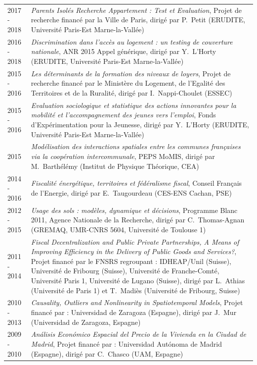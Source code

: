 \documentclass[a4paper,12pt]{article}
\begin{document}
\begin{longtable}{@{}p{\annee}p{\texte}@{}}
2017 - 2018 & \og{}\textit{Parents Isolés Recherche Appartement : Test et Evaluation}\fg{}, Projet de recherche financé par la Ville de Paris, dirigé par P.~Petit (ERUDITE, Université Paris-Est Marne-la-Vallée) \\
2016 - 2018 & \og{}\textit{Discrimination dans l'accès au logement : un testing de couverture nationale}\fg{}, ANR 2015 Appel générique, dirigé par Y.~L'Horty (ERUDITE, Université Paris-Est Marne-la-Vallée) \\
2015 - 2016 & \og{}\textit{Les déterminants de la formation des niveaux de loyers}\fg{}, Projet de recherche financé par le Ministère du Logement, de l'Egalité des Territoires et de la Ruralité, dirigé par I.~Nappi-Choulet (ESSEC) \\
2015 - 2016 & \og{}\textit{Evaluation sociologique et statistique des actions innovantes pour la mobilité et l'accompagnement des jeunes vers l'emploi}\fg{}, Fonds d'Expérimentation pour la Jeunesse, dirigé par Y.~L'Horty (ERUDITE, Université Paris-Est Marne-la-Vallée) \\
2015 		& \og{}\textit{Modélisation des interactions spatiales entre les communes françaises via la coopération intercommunale}\fg{}, PEPS MoMIS, dirigé par M.~Barthélémy (Institut de Physique Théorique, CEA) \\
2014 - 2016 & \og{}\textit{Fiscalité énergétique, territoires et fédéralisme fiscal}\fg{}, Conseil Français de l'Energie, dirigé par E.~Taugourdeau (CES-ENS Cachan, PSE) \\
2012 - 2015 & \og{}\textit{Usage des sols : modèles, dynamique et décisions}\fg{}, Programme Blanc 2011, Agence Nationale de la Recherche, dirigé par C.~Thomas-Agnan (GREMAQ, UMR-CNRS 5604, Université de Toulouse 1) \\
2011 - 2014 & \og{}\textit{Fiscal Decentralization and Public Private Partnerships, A Means of Improving Efficiency in the Delivery of Public Goods and Services?}\fg{}, Projet financé par le FNSRS regroupant : IDHEAP/Unil (Suisse), Université de Fribourg (Suisse), Université de Franche-Comté, Université Paris 1, Université de Lugano (Suisse), dirigé par L.~Athias (Université de Paris 1) et T.~Madiès (Université de Fribourg, Suisse)\\
2010 - 2013 & \og{}\textit{Causality, Outliers and Nonlinearity in Spatiotemporal Models}\fg{}, Projet financé par : Universidad de Zaragoza (Espagne), dirigé par J.~Mur (Universidad de Zaragoza, Espagne)\\
2009 - 2010 & \og{}\textit{Análisis Económico Espacial del Precio de la Vivienda en la Ciudad de Madrid}\fg{}, Projet financé par : Universidad Autónoma de Madrid (Espagne), dirigé par C.~Chasco (UAM, Espagne)\\

\end{longtable}
\end{document}

